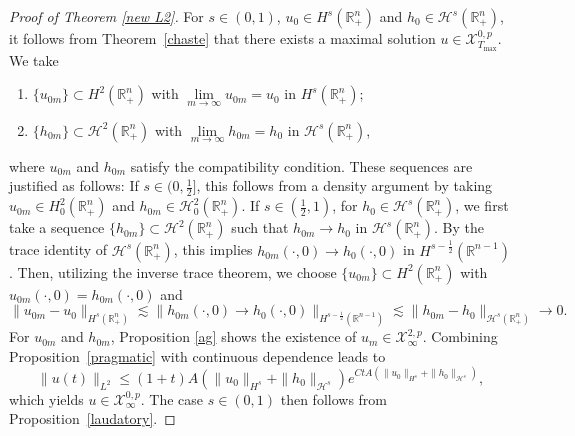 \documentclass[preprint,compress,12pt]{elsarticle}
\numberwithin{equation}{section}
\begin{document}
\begin{proof}[Proof of Theorem \ref{new L2}]
	For $s\in(0,1)$, $u_0 \in H^{s}(\mathbb{R}_+^n)$ and $h_0 \in \mathcal{H}^s(\mathbb{R}^{n}_{+})$, it follows from Theorem~\ref{chaste}   that  there exists a maximal solution $u\in\mathscr{X}^{0,p}_{T_{\max}}$. We take
	\begin{enumerate}[label=(\roman*)]
		\item $\{u_{0m}\} \subset H^2(\mathbb{R}_+^n)$ with $\lim\limits_{m\to\infty} u_{0m} = u_0$ in $H^{s}(\mathbb{R}_+^n)$;
		\item $\{h_{0m}\} \subset \mathcal{H}^2(\mathbb{R}^{n}_{+})$ with $\lim\limits_{m\to\infty} h_{0m} = h_0$ in $\mathcal{H}^s(\mathbb{R}^{n}_{+})$,
	\end{enumerate}
	where $u_{0m}$ and $h_{0m}$ satisfy the compatibility condition. These sequences are justified as follows: If $s\in(0,\frac{1}{2}]$, this follows from a density argument by taking $u_{0m}\in H_{0}^{2}(\mathbb{R}^{n}_{+})$ and $h_{0m}\in\mathcal{H}_{0}^{2}(\mathbb{R}^{n}_{+})$. If $s\in(\frac{1}{2},1)$, for $h_{0}\in\mathcal{H}^{s}(\mathbb{R}^{n}_{+})$, we first take a sequence $\{h_{0m}\}\subset \mathcal{H}^{2}(\mathbb{R}^{n}_{+})$ such that $h_{0m}\rightarrow h_{0}$ in $\mathcal{H}^{s}(\mathbb{R}^{n}_{+})$. By the trace identity of $\mathcal{H}^{s}(\mathbb{R}^{n}_{+})$, this implies $h_{0m}(\cdot,0)\rightarrow h_{0}(\cdot,0)$ in $H^{s-\frac{1}{2}}(\mathbb{R}^{n-1})$. Then, utilizing the inverse trace theorem, we choose $\{u_{0m}\}\subset  H^{2}(\mathbb{R}^{n}_{+})$ with $u_{0m}(\cdot,0)=h_{0m}(\cdot,0)$ and
	\begin{equation} \|u_{0m}-u_{0}\|_{H^{s}(\mathbb{R}^{n}_{+})}\lesssim \|  h_{0m}(\cdot,0)\rightarrow h_{0}(\cdot,0)\|_{H^{s-\frac{1}{2}}(\mathbb{R}^{n-1})}\lesssim \|h_{0m}-h_{0}\|_{\mathcal{H}^{s}(\mathbb{R}^{n}_{+})}\rightarrow0.
	\end{equation}
	For $u_{0m}$ and $h_{0m}$, Proposition \ref{ag} shows the existence of $u_{m}\in\mathscr{X}^{2,p}_{\infty}$. Combining  Proposition~\ref{pragmatic}  with continuous dependence leads to
	\begin{equation}
		\|u(t)\|_{L^{2}}\leq (1+t) A\left(\|u_{0}\|_{H^{s}}+\|h_{0}\|_{\mathcal{H}^{s}}\right) e^{CtA\left(\|u_{0}\|_{H^s}+\|h_{0}\|_{\mathcal{H}^{s}}\right)},
	\end{equation}
	which yields $u\in\mathscr{X}^{0,p}_{\infty}$. The case $s\in(0,1)$ then follows from  Proposition~\ref{laudatory}.
\end{proof}
\end{document}
